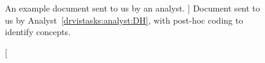 \begin{figure}
    \centering
    \caption
    [
        An example document sent to us by an analyst.
    ]
    {
        Document sent to us by Analyst~\ref{drvistasks:analyst:DH}, with post-hoc coding to identify concepts.
    }
    \label{fig:dhnotes}
    \centering
\end{figure}



